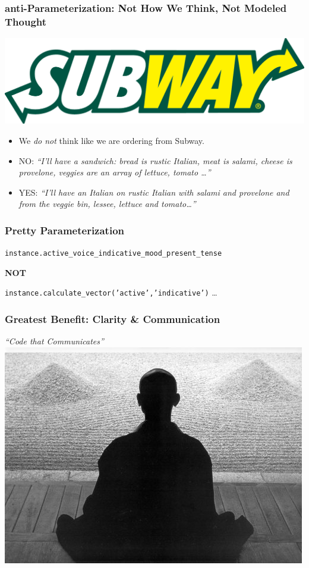 \documentclass[slidestop,compress,mathserif]{beamer}
\begin{document}
\begin{frame}
	\frametitle{anti-Parameterization:  Not How We Think, Not Modeled Thought}

		\begin{center}
			\includegraphics[scale=0.15]{img/SubwayLogo.png}
		\end{center}

	\begin{itemize}
		\item We \emph{do not} think like we are ordering from Subway.
		\pause
		\item NO:  \emph{``I'll have a sandwich:  bread is rustic Italian, meat is salami, cheese is provelone, veggies are an array of lettuce, tomato \ldots''}
		\pause
		\item YES:  \emph{``I'll have an Italian on rustic Italian with salami and provelone and from the veggie bin, lessee, lettuce and tomato\ldots''}
	\end{itemize}

\end{frame}

\begin{frame}
	\frametitle{Pretty Parameterization}
	\texttt{instance.active\_voice\_indicative\_mood\_present\_tense}
	\begin{center}
		\textbf{NOT}
	\end{center}
	\texttt{instance.calculate\_vector('active','indicative')} \ldots
\end{frame}

\begin{frame}
	\frametitle{Greatest Benefit: Clarity \& Communication}
	\begin{center}
		\emph{``Code that Communicates''}
		\includegraphics[scale=0.45]{img/Zen04.jpg}
	\end{center}
\end{frame}
\end{document}
